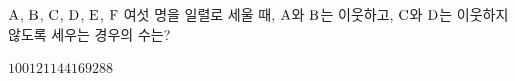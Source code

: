 $\mathrm{A}$, $\mathrm{B}$, $\mathrm{C}$, $\mathrm{D}$, $\mathrm{E}$, $\mathrm{F}$ 여섯 명을 일렬로 세울 때, $\mathrm{A}$와 $\mathrm{B}$는 이웃하고, $\mathrm{C}$와 $\mathrm{D}$는 이웃하지 않도록 세우는 경우의 수는?
\begin{choices32}{$100$}{$121$}{$144$}{$169$}{$288$}\end{choices32}
